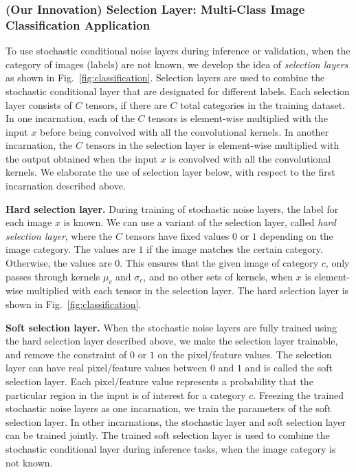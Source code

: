 \documentclass[12pt, letterpaper]{article}
\begin{document}
\subsubsection{(Our Innovation) Selection Layer: Multi-Class Image Classification Application}
To use stochastic conditional noise layers during inference or validation, when the category of images (labels) are not known, we develop the idea of \emph{selection layers} as shown in Fig.~\ref{fig:classification}. Selection layers are used to combine the stochastic conditional layer that are designated for different labels. Each selection layer consists of $C$ tensors, if there are $C$ total categories in the training dataset.
In one incarnation, each of the $C$ tensors is element-wise multiplied with the input $x$ before being convolved with all the convolutional kernels. In another incarnation, the $C$ tensors in the selection layer is element-wise multiplied with the output obtained when the input $x$ is convolved with all the convolutional kernels. We elaborate the use of selection layer below, with respect to the first incarnation described above.

\noindent \textbf{Hard selection layer.}
During training of stochastic noise layers, the label for each image $x$ is known. We can use a variant of the selection layer, called \emph{hard selection layer}, where the $C$ tensors have fixed values $0$ or $1$ depending on the image category. The  values are $1$ if the image matches the certain category. Otherwise, the values are $0$. This ensures that the given image of category $c$, only passes through kernels $\mu_c$ and $\sigma_c$, and no other sets of kernels, when $x$ is element-wise multiplied with each tensor in the selection layer. The hard selection layer is shown in Fig.~\ref{fig:classification}. 

\noindent \textbf{Soft selection layer.} When the stochastic noise layers are fully trained using the hard selection layer described above, we make the selection layer trainable, and remove the constraint of $0$ or $1$ on the pixel/feature values. The selection layer can have real pixel/feature values between $0$ and $1$ and is called the soft selection layer. Each pixel/feature value represents a probability that the particular region in the input is of interest for a category $c$. Freezing the trained stochastic noise layers as one incarnation, we train the parameters of the soft selection layer. In other incarnations, the stochastic layer and soft selection layer can be trained jointly. The trained soft selection layer is used to combine the stochastic conditional layer during inference tasks, when the image category is not known.
\end{document}
